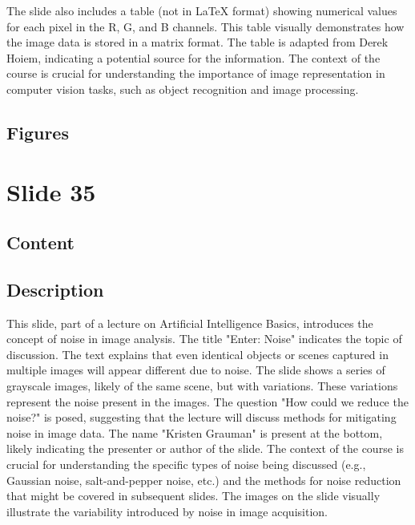 \documentclass{article}%
\begin{document}
The slide also includes a table (not in LaTeX format) showing numerical values for each pixel in the R, G, and B channels.  This table visually demonstrates how the image data is stored in a matrix format.  The table is adapted from Derek Hoiem, indicating a potential source for the information.  The context of the course is crucial for understanding the importance of image representation in computer vision tasks, such as object recognition and image processing.
%
\subsection{Figures}%
\begin{figure}[H]%
\centering%
\end{figure}

%
\newpage%
\section{Slide 35}%
\label{sec:Slide35}%
\subsection{Content}%
%
\subsection{Description}%
This slide, part of a lecture on Artificial Intelligence Basics, introduces the concept of noise in image analysis.  The title "Enter: Noise" indicates the topic of discussion.  The text explains that even identical objects or scenes captured in multiple images will appear different due to noise.  The slide shows a series of grayscale images, likely of the same scene, but with variations.  These variations represent the noise present in the images.  The question "How could we reduce the noise?" is posed, suggesting that the lecture will discuss methods for mitigating noise in image data.  The name "Kristen Grauman" is present at the bottom, likely indicating the presenter or author of the slide.  The context of the course is crucial for understanding the specific types of noise being discussed (e.g., Gaussian noise, salt-and-pepper noise, etc.) and the methods for noise reduction that might be covered in subsequent slides.  The images on the slide visually illustrate the variability introduced by noise in image acquisition.%
\end{document}
